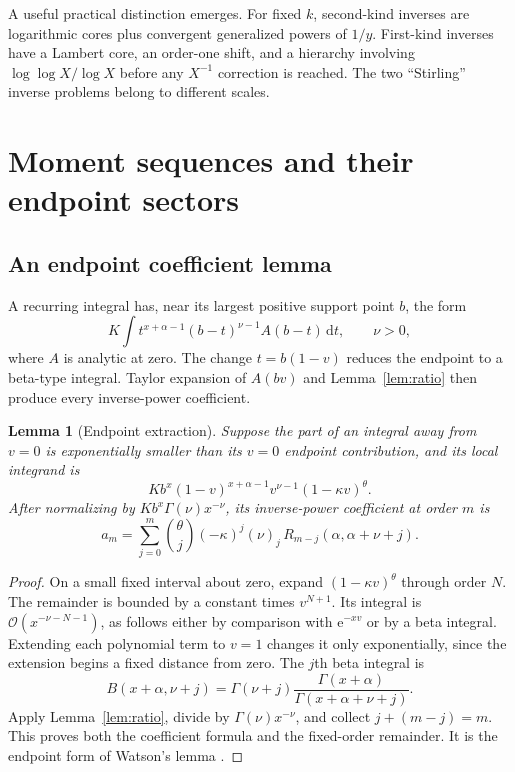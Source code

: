 \documentclass[11pt,a4paper]{article}
\numberwithin{equation}{section}
\newtheorem{lemma}[theorem]{Lemma}
\theoremstyle{definition}
\theoremstyle{remark}
\newcommand{\dd}{\,\mathrm d}
\newcommand{\ee}{\mathrm e}
\newcommand{\bigO}{\mathcal O}
\newcommand{\rising}[2]{(#1)_{#2}}
\begin{document}
A useful practical distinction emerges. For fixed $k$, second-kind inverses are logarithmic cores plus convergent generalized powers of $1/y$. First-kind inverses have a Lambert core, an order-one shift, and a hierarchy involving $\log\log X/\log X$ before any $X^{-1}$ correction is reached. The two ``Stirling'' inverse problems belong to different scales.

\section{Moment sequences and their endpoint sectors}
\label{sec:moments}

\subsection{An endpoint coefficient lemma}

A recurring integral has, near its largest positive support point $b$, the form
\[
 K\int t^{x+\alpha-1}(b-t)^{\nu-1}A(b-t)\dd t,
 \qquad \nu>0,
\]
where $A$ is analytic at zero. The change $t=b(1-v)$ reduces the endpoint to a beta-type integral. Taylor expansion of $A(bv)$ and Lemma~\ref{lem:ratio} then produce every inverse-power coefficient.

\begin{lemma}[Endpoint extraction]
\label{lem:endpoint}
Suppose the part of an integral away from $v=0$ is exponentially smaller than its $v=0$ endpoint contribution, and its local integrand is
\[
 Kb^x(1-v)^{x+\alpha-1}v^{\nu-1}(1-\kappa v)^\theta.
\]
After normalizing by $Kb^x\Gamma(\nu)x^{-\nu}$, its inverse-power coefficient at order $m$ is
\begin{equation}
 a_m=\sum_{j=0}^m\binom\theta j(-\kappa)^j
          \rising\nu j\,R_{m-j}(\alpha,\alpha+\nu+j).
 \label{eq:endpoint-coeff}
\end{equation}
\end{lemma}
\begin{proof}
On a small fixed interval about zero, expand $(1-\kappa v)^\theta$ through order $N$. The remainder is bounded by a constant times $v^{N+1}$. Its integral is $\bigO(x^{-\nu-N-1})$, as follows either by comparison with $\ee^{-xv}$ or by a beta integral. Extending each polynomial term to $v=1$ changes it only exponentially, since the extension begins a fixed distance from zero. The $j$th beta integral is
\[
 B(x+\alpha,\nu+j)=\Gamma(\nu+j)
 \frac{\Gamma(x+\alpha)}{\Gamma(x+\alpha+\nu+j)}.
\]
Apply Lemma~\ref{lem:ratio}, divide by $\Gamma(\nu)x^{-\nu}$, and collect $j+(m-j)=m$. This proves both the coefficient formula and the fixed-order remainder. It is the endpoint form of Watson's lemma \cite{dlmflaplace}.
\end{proof}
\end{document}
